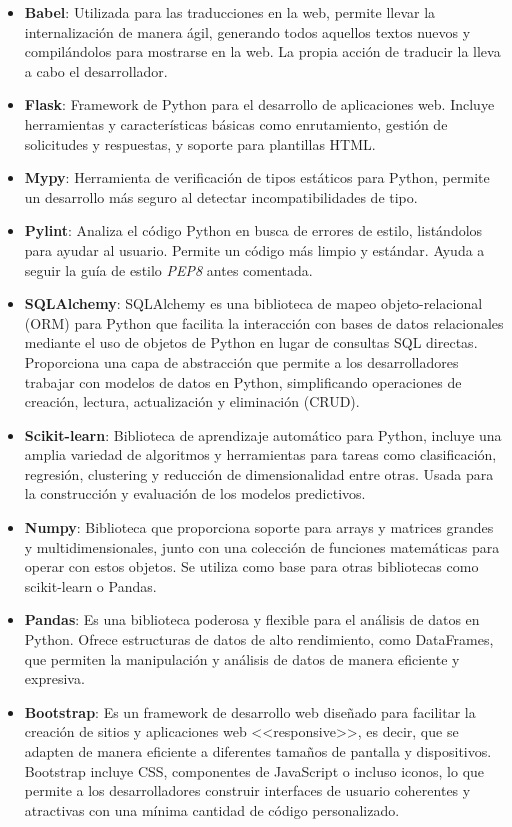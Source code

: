 \begin{itemize}
	\item \textbf{Babel}: Utilizada para las traducciones en la web, permite llevar la internalización de manera ágil, generando todos aquellos textos nuevos y compilándolos para mostrarse en la web. La propia acción de traducir la lleva a cabo el desarrollador.
	\item \textbf{Flask}: Framework de Python para el desarrollo de aplicaciones web. Incluye herramientas y características básicas como enrutamiento, gestión de solicitudes y respuestas, y soporte para plantillas HTML.
	\item \textbf{Mypy}: Herramienta de verificación de tipos estáticos para Python, permite un desarrollo más seguro al detectar incompatibilidades de tipo.
	\item \textbf{Pylint}: Analiza el código Python en busca de errores de estilo, listándolos para ayudar al usuario. Permite un código más limpio y estándar. Ayuda a seguir la guía de estilo \textit{PEP8} antes comentada.
	\item \textbf{SQLAlchemy}: SQLAlchemy es una biblioteca de mapeo objeto-relacional (ORM) para Python que facilita la interacción con bases de datos relacionales mediante el uso de objetos de Python en lugar de consultas SQL directas. Proporciona una capa de abstracción que permite a los desarrolladores trabajar con modelos de datos en Python, simplificando operaciones de creación, lectura, actualización y eliminación (CRUD).
	\item \textbf{Scikit-learn}: Biblioteca de aprendizaje automático para Python, incluye una amplia variedad de algoritmos y herramientas para tareas como clasificación, regresión, clustering y reducción de dimensionalidad entre otras. Usada para la construcción y evaluación de los modelos predictivos.
	\item \textbf{Numpy}: Biblioteca que proporciona soporte para arrays y matrices grandes y multidimensionales, junto con una colección de funciones matemáticas para operar con estos objetos. Se utiliza como base para otras bibliotecas como scikit-learn o Pandas.
	\item \textbf{Pandas}: Es una biblioteca poderosa y flexible para el análisis de datos en Python. Ofrece estructuras de datos de alto rendimiento, como DataFrames, que permiten la manipulación y análisis de datos de manera eficiente y expresiva.
	\item \textbf{Bootstrap}: Es un framework de desarrollo web diseñado para facilitar la creación de sitios y aplicaciones web <<responsive>>, es decir, que se adapten de manera eficiente a diferentes tamaños de pantalla y dispositivos. Bootstrap incluye CSS, componentes de JavaScript o incluso iconos, lo que permite a los desarrolladores construir interfaces de usuario coherentes y atractivas con una mínima cantidad de código personalizado.
	

\end{itemize}

